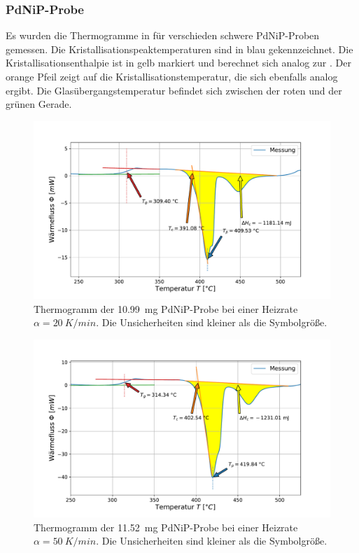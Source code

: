\documentclass[
	a4paper,
	12pt,
	pagesize,
	ngerman
]{scrartcl}
\begin{document}
	\subsubsection*{PdNiP-Probe}
	Es wurden die Thermogramme in  für verschieden schwere PdNiP-Proben gemessen.
	Die Kristallisationspeaktemperaturen sind in blau gekennzeichnet.
	Die Kristallisationsenthalpie ist in gelb markiert und berechnet sich analog zur .
	Der orange Pfeil zeigt auf die Kristallisationstemperatur, die sich ebenfalls analog ergibt.
	Die Glasübergangstemperatur befindet sich zwischen der roten und der grünen Gerade.

	\begin{figure}[H]
			\includegraphics[width=\linewidth]{img/Kalorimetrie_pdnip_20.pdf}
			\caption{
				Thermogramm der \SI{10.99}{mg} PdNiP-Probe bei einer Heizrate $\alpha = \SI{20}{K/min}$.
			Die Unsicherheiten sind kleiner als die Symbolgröße.
			}
			\label{fig_themo_pdnip_20}
		\end{figure}
	\begin{figure}[H]
			\includegraphics[width=\linewidth]{img/Kalorimetrie_pdnip_50.pdf}
			\caption{
				Thermogramm der \SI{11.52}{mg} PdNiP-Probe bei einer Heizrate $\alpha = \SI{50}{K/min}$.
			Die Unsicherheiten sind kleiner als die Symbolgröße.
			}
			\label{fig_themo_pdnip_50}
		\end{figure}
\end{document}
